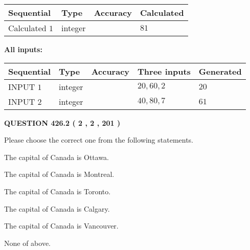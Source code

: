 \documentclass[12pt]{article}
\begin{document}
   
   
   
\noindent{}
   
   
  
  
\noindent\begin{tabular}{|l|l|l|l|}
\hline
 Sequential & Type & Accuracy & Calculated \\ 
\hline
 
 
  Calculated $  1 $ & integer &  & 
  $ 81 $ 
 \\  \hline  
 \end{tabular}
   
   
   
   
\noindent\vspace{0.1in}\hspace{-0.08in} {\textbf{\Large{All inputs: }}}
   
   
  
  
\noindent\begin{tabular}{|l|l|l|l|l|}
\hline
 Sequential & Type & Accuracy & Three inputs & Generated \\ 
\hline
 
 
  INPUT $  1 $ & integer &  & $
 20
 , 
 60
 , 
 2
 $ & $ 20 $ 
 \\  \hline  
 
 
  INPUT $  2 $ & integer &  & $
 40
 , 
 80
 , 
 7
 $ & $ 61 $ 
 \\  \hline  
 \end{tabular}
   
   
  
\vspace{0.2in}
  
{\textbf{\Large{QUESTION
426.2 
 ( 2 , 2 , 201 )
}}}
  
  
Please choose the correct one from the following statements.
 
 
The capital of Canada is Ottawa.
 
 
The capital of Canada is Montreal.
 
 
The capital of Canada is Toronto.
 
 
The capital of Canada is Calgary.
 
 
The capital of Canada is Vancouver.
 
 
 None of above.
 
 
\noindent{}
 
\end{document}
